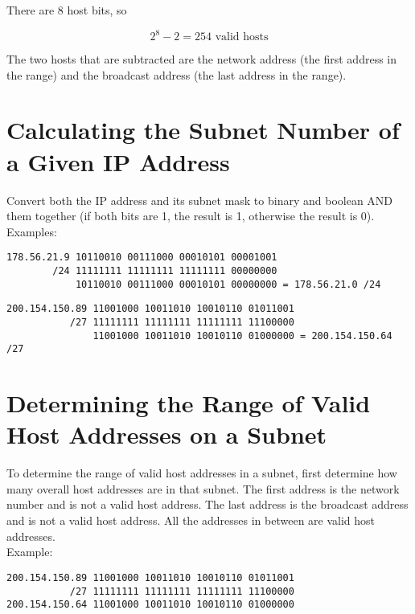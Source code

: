 \documentclass{article}
\begin{document}
There are 8 host bits, so

\begin{equation}
2 ^ 8 - 2 = 254 \mbox{ valid hosts}
\end{equation}

The two hosts that are subtracted are the network address (the first address in
the range) and the broadcast address (the last address in the range).

\section{Calculating the Subnet Number of a Given IP Address}

Convert both the IP address and its subnet mask to binary and boolean AND
them together (if both bits are 1, the result is 1, otherwise the result is
0).\\

Examples:

\begin{verbatim}
178.56.21.9 10110010 00111000 00010101 00001001
        /24 11111111 11111111 11111111 00000000
            10110010 00111000 00010101 00000000 = 178.56.21.0 /24
\end{verbatim}

\begin{verbatim}
200.154.150.89 11001000 10011010 10010110 01011001
           /27 11111111 11111111 11111111 11100000
               11001000 10011010 10010110 01000000 = 200.154.150.64 /27
\end{verbatim}

\section{Determining the Range of Valid Host Addresses on a Subnet}

To determine the range of valid host addresses in a subnet, first determine
how many overall host addresses are in that subnet. The first address is the
network number and is not a valid host address. The last address is the
broadcast address and is not a valid host address. All the addresses in
between are valid host addresses.\\

Example:

\begin{verbatim}
200.154.150.89 11001000 10011010 10010110 01011001
           /27 11111111 11111111 11111111 11100000
200.154.150.64 11001000 10011010 10010110 01000000
\end{verbatim}
\end{document}
